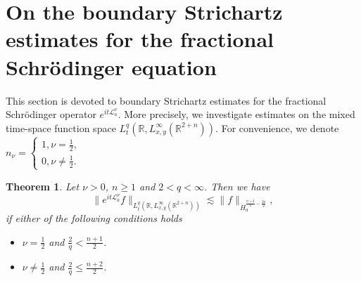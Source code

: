 \documentclass[a4paper,11pt, reqno]{amsart}
\numberwithin{equation}{section}
\theoremstyle{plain}
\newtheorem{theorem}{Theorem}[section]
\theoremstyle{definition}
\theoremstyle{remark}
\begin{document}
\section{On the boundary Strichartz estimates for the fractional Schr\"odinger equation}\label{boundary section}
This section is devoted to boundary Strichartz estimates for the
fractional Schr\"odinger operator $e^{it\mathcal{L}_a^\nu}$. More precisely, we investigate estimates on the mixed time-space function space $L_t^q(\mathbb{R},L_{x,y}^\infty(\mathbb{R}^{2+n}))$. For convenience, we denote $n_\nu=\begin{cases}1,\nu=\frac{1}{2},\\
0,\nu\neq\frac{1}{2}.\end{cases}$
\begin{theorem}\label{boundary}
Let $\nu>0$, $n\geq 1$ and $2<q<\infty$. Then we have
\begin{equation}\label{boundary estimate}
\|e^{it\mathcal{L}_a^\nu} f\|_{L_t^q(\mathbb{R},L_{x,y}^\infty(\mathbb{R}^{2+n}))}\lesssim \|f\|_{\dot{H}_a^{\frac{n+2}{2}-\frac{2\nu}{q}}},
\end{equation}
if either of the following conditions holds
\begin{itemize}
\item $\nu=\frac{1}{2}$ and $\frac{2}{q}<\frac{n+1}{2}$.
\item $\nu\not=\frac{1}{2}$ and $\frac{2}{q}\leq\frac{n+2}{2}$.
\end{itemize}
\end{theorem}
\end{document}
